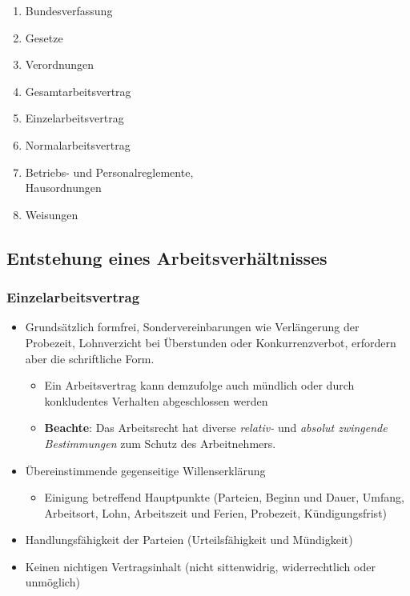 \begin{minipage}{0.5\linewidth} 
    \begin{enumerate}
        \item Bundesverfassung
        \item Gesetze
        \item Verordnungen
        \item Gesamtarbeitsvertrag
        \item Einzelarbeitsvertrag
    \end{enumerate}
\end{minipage}
\begin{minipage}{0.5\linewidth}
    \begin{enumerate}
        \setcounter{enumi}{5}
        \item Normalarbeitsvertrag
        \item Betriebs- und Personalreglemente,\\ Hausordnungen
        \item Weisungen
    \end{enumerate}
\end{minipage}

\subsection{Entstehung eines Arbeitsverhältnisses}

\subsubsection{Einzelarbeitsvertrag}
\begin{itemize}
    \item Grundsätzlich formfrei, Sondervereinbarungen wie Verlängerung der Probezeit, Lohnverzicht bei Überstunden oder Konkurrenzverbot, erfordern aber die schriftliche Form.
    \begin{itemize}
        \item Ein Arbeitsvertrag kann demzufolge auch mündlich oder durch konkludentes Verhalten abgeschlossen werden
        \item \textbf{Beachte}: Das Arbeitsrecht hat diverse \textit{relativ-} und \textit{absolut zwingende Bestimmungen} zum Schutz des Arbeitnehmers.
    \end{itemize}
    \item Übereinstimmende gegenseitige Willenserklärung
    \begin{itemize}
        \item Einigung betreffend Hauptpunkte (Parteien, Beginn und Dauer, Umfang, Arbeitsort, Lohn, Arbeitszeit und Ferien, Probezeit, Kündigungsfrist)
    \end{itemize}
    \item Handlungsfähigkeit der Parteien (Urteilsfähigkeit und Mündigkeit)
    \item Keinen nichtigen Vertragsinhalt (nicht sittenwidrig, widerrechtlich oder unmöglich)
\end{itemize}

